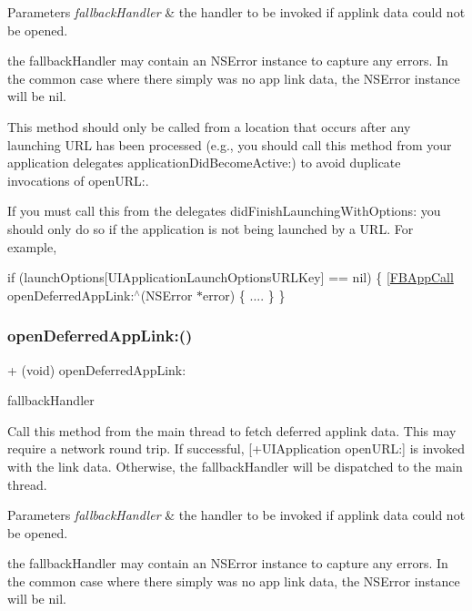 \begin{DoxyParams}{Parameters}
{\em fallback\+Handler} & the handler to be invoked if applink data could not be opened.\\
\hline
\end{DoxyParams}
the fallback\+Handler may contain an N\+S\+Error instance to capture any errors. In the common case where there simply was no app link data, the N\+S\+Error instance will be nil.

This method should only be called from a location that occurs after any launching U\+RL has been processed (e.\+g., you should call this method from your application delegate\textquotesingle{}s application\+Did\+Become\+Active\+:) to avoid duplicate invocations of open\+U\+RL\+:.

If you must call this from the delegate\textquotesingle{}s did\+Finish\+Launching\+With\+Options\+: you should only do so if the application is not being launched by a U\+RL. For example,

if (launch\+Options\mbox{[}U\+I\+Application\+Launch\+Options\+U\+R\+L\+Key\mbox{]} == nil) \{ \mbox{[}\hyperlink{interfaceFBAppCall}{F\+B\+App\+Call} open\+Deferred\+App\+Link\+:$^\wedge$(N\+S\+Error $\ast$error) \{ .... \} \} \mbox{\label{interfaceFBAppCall_a02498c71e0be169b1ae49136d1446a23}} 
\subsubsection{\texorpdfstring{open\+Deferred\+App\+Link\+:()}{openDeferredAppLink:()}\hspace{0.1cm}{\footnotesize\ttfamily [2/5]}}
{\footnotesize\ttfamily + (void) open\+Deferred\+App\+Link\+: \begin{DoxyParamCaption}\item[{(F\+B\+App\+Link\+Fallback\+Handler)}]{fallback\+Handler }\end{DoxyParamCaption}}

Call this method from the main thread to fetch deferred applink data. This may require a network round trip. If successful, \mbox{[}+\+U\+I\+Application open\+U\+RL\+:\mbox{]} is invoked with the link data. Otherwise, the fallback\+Handler will be dispatched to the main thread.


\begin{DoxyParams}{Parameters}
{\em fallback\+Handler} & the handler to be invoked if applink data could not be opened.\\
\hline
\end{DoxyParams}
the fallback\+Handler may contain an N\+S\+Error instance to capture any errors. In the common case where there simply was no app link data, the N\+S\+Error instance will be nil.

